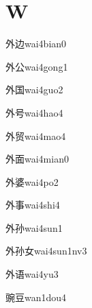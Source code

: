 ﻿%
\section*{W}

\begin{verbete}[5;5]{外边}{wai4bian0}
\end{verbete}

\begin{verbete}[5;4]{外公}{wai4gong1}
\end{verbete}

\begin{verbete}[5;8]{外国}{wai4guo2}
\end{verbete}

\begin{verbete}[5;5]{外号}{wai4hao4}
\end{verbete}

\begin{verbete}[5;9]{外贸}{wai4mao4}
\end{verbete}

\begin{verbete}[5;9]{外面}{wai4mian0}
\end{verbete}

\begin{verbete}[5;11]{外婆}{wai4po2}
\end{verbete}

\begin{verbete}[5;8]{外事}{wai4shi4}
\end{verbete}

\begin{verbete}[5;6]{外孙}{wai4sun1}
\end{verbete}

\begin{verbete}[5;6;3]{外孙女}{wai4sun1nv3}
\end{verbete}

\begin{verbete}[5;9]{外语}{wai4yu3}
\end{verbete}

\begin{verbete}[15;7]{豌豆}{wan1dou4}
\end{verbete}

